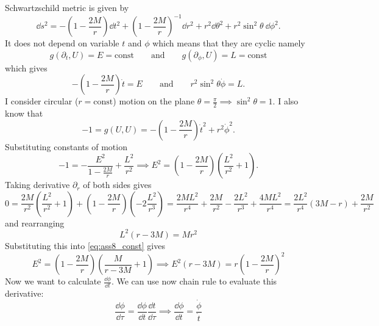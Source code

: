 Schwartzschild metric is given by
%
\begin{equation}
    \dd s^2 = -\left(1-\frac{2M}{r}\right) \dd t^2 +
    \left(1-\frac{2M}{r}\right)^{-1} \dd r^2 +
    r^2 \dd \theta^2 +
    r^2 \sin^2\theta~ \dd \phi^2.
\end{equation}
%
It does not depend on variable $t$ and $\phi$ which means that they are cyclic
namely
\begin{equation}
    g(\partial_t, U) = E = \text{const}
    \qquad \text{and} \qquad
    g(\partial_\phi, U) = L = \text{const}
\end{equation}
%
which gives
%
\begin{equation}
    -\left(1-\frac{2M}{r}\right) \dot{t} = E
    \qquad \text{and} \qquad
    r^2 \sin^2\theta \dot{\phi} = L.
\end{equation}
%
I consider circular ($r = \text{const}$) motion on the plane $\theta =
    \frac{\pi}{2} \implies \sin^2\theta = 1$. I also know that
%
\begin{equation}
    -1 = g(U,U) = -\left(1-\frac{2M}{r}\right) \dot{t}^2 +
    r^2 \dot{\phi}^2.
\end{equation}
%
Substituting constants of motion
%
\begin{equation}
    -1 = -\frac{E^2}{1-\frac{2M}{r}} +
    \frac{L^2}{r^2} \implies
    E^2 = \left(1-\frac{2M}{r}\right)\left(\frac{L^2}{r^2} + 1\right).
    \label{eq:ass8_const}
\end{equation}
%
Taking derivative $\partial_r$ of both sides gives
%
\begin{equation}
    0 = \frac{2M}{r^2}\left(\frac{L^2}{r^2} + 1\right) +
    \left(1-\frac{2M}{r}\right) \left(-2 \frac{L^2}{r^3}\right) =
    \frac{2ML^2}{r^4} + \frac{2M}{r^2} - \frac{2L^2}{r^3} + \frac{4ML^2}{r^4} =
    \frac{2L^2}{r^4}\left(3M - r\right) + \frac{2M}{r^2}
\end{equation}
%
and rearranging
%
\begin{equation}
    L^2(r - 3M) = Mr^2
\end{equation}
%
Substituting this into \cref{eq:ass8_const} gives
%
\begin{equation}
    E^2 = \left(1-\frac{2M}{r}\right)\left(\frac{M}{r - 3M} + 1\right) \implies
    E^2 (r-3M) = r\left(1-\frac{2M}{r}\right)^2
\end{equation}
%
Now we want to calculate $\frac{\dd \phi}{\dd t}$. We can use now chain rule to
evaluate this derivative:
%
\begin{equation}
    \frac{\dd \phi}{\dd \tau} = \frac{\dd \phi}{\dd t} \frac{\dd t}{\dd \tau}
    \implies
    \frac{\dd \phi}{\dd t} = \frac{\dot{\phi}}{\dot{t}}
\end{equation}
